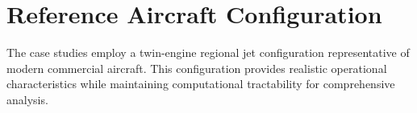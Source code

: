 \section{Reference Aircraft Configuration}

The case studies employ a twin-engine regional jet configuration representative of modern commercial aircraft. This configuration provides realistic operational characteristics while maintaining computational tractability for comprehensive analysis.